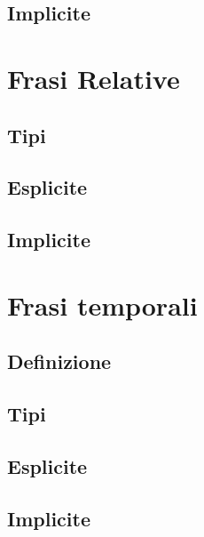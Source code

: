 \documentclass[a4paper,twoside,11pt,chapterprefix=false,bibliography=totocnumbered,listof=flat]{scrbook}
\begin{document}
\hypertarget{implicite}{%
\section{Implicite}\label{implicite}}

\hypertarget{frasi-relative}{%
\chapter{Frasi Relative}\label{frasi-relative}}

\hypertarget{tipi}{%
\section{Tipi}\label{tipi}}

\hypertarget{esplicite-1}{%
\section{Esplicite}\label{esplicite-1}}

\hypertarget{implicite-1}{%
\section{Implicite}\label{implicite-1}}

\hypertarget{frasi-temporali}{%
\chapter{Frasi temporali}\label{frasi-temporali}}

\hypertarget{definizione}{%
\section{Definizione}\label{definizione}}

\hypertarget{tipi-1}{%
\section{Tipi}\label{tipi-1}}

\hypertarget{esplicite-2}{%
\section{Esplicite}\label{esplicite-2}}

\hypertarget{implicite-2}{%
\section{Implicite}\label{implicite-2}}
\end{document}
